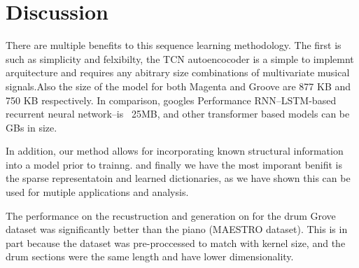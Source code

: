 \documentclass[11pt,a4paper]{article}
\begin{document}
\section{Discussion}
\label{ssec:discussion}

There are multiple benefits to this sequence learning methodology. The first is such as simplicity and felxibilty, the TCN autoencocoder is a simple to implemnt arquitecture and requires any abitrary size combinations of multivariate musical signals.Also the size of the model for both Magenta and Groove are 877 KB and 750 KB respectively. In comparison, googles Performance RNN--LSTM-based recurrent neural network--is ~25MB, and other transformer based models can be GBs in size. 

In addition, our method allows for incorporating known structural information into a model prior to trainng. and finally we have the most imporant benifit is the sparse representatoin and learned dictionaries, as we have shown this can be used for mutiple applications and analysis. 

The performance on the recustruction and generation on for the drum Grove dataset  was significantly better than the piano (MAESTRO dataset). This is in part because the dataset was pre-proccessed to match with kernel size, and the drum sections were the same length and have lower dimensionality. 





\end{document}
